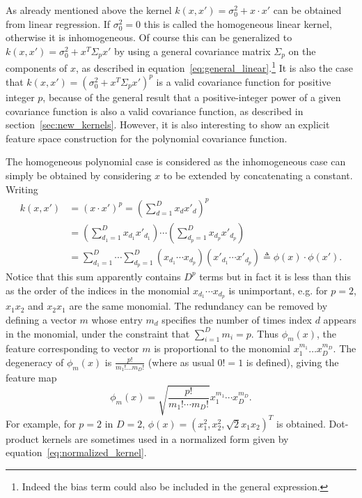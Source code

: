 \documentclass[11pt]{book}
\begin{document}
As already mentioned above the kernel $k(x, x') = \sigma_0^2 + x \cdot x'$ can be obtained from linear regression. If $\sigma_0^2 = 0$ this is called the homogeneous linear kernel, otherwise it is inhomogeneous. Of course this can be generalized to $k(x, x') = \sigma_0^2 + x^T \Sigma_p x'$ by using a general covariance matrix $\Sigma_p$ on the components of $x$, as described in equation~\eqref{eq:general_linear}.\footnote{Indeed the bias term could also be included in the general expression.} It is also the case that $k(x, x') = (\sigma_0^2 + x^T \Sigma_p x')^p$ is a valid covariance function for positive integer $p$, because of the general result that a positive-integer power of a given covariance function is also a valid covariance function, as described in section~\ref{sec:new_kernels}. However, it is also interesting to show an explicit feature space construction for the polynomial covariance function.

The homogeneous polynomial case is considered as the inhomogeneous case can simply be obtained by considering $x$ to be extended by concatenating a constant. Writing
\begin{align}
\label{eq:polynomial_expansion}
k(x, x') &= (x \cdot x')^p = \left(\sum_{d=1}^D x_d x'_d\right)^p \\
&= \left(\sum_{d_1=1}^D x_{d_1} x'_{d_1}\right) \cdots \left(\sum_{d_p=1}^D x_{d_p} x'_{d_p}\right) \nonumber \\
&= \sum_{d_1=1}^D \cdots \sum_{d_p=1}^D (x_{d_1} \cdots x_{d_p})(x'_{d_1} \cdots x'_{d_p}) \triangleq \phi(x) \cdot \phi(x'). \nonumber
\end{align}
Notice that this sum apparently contains $D^p$ terms but in fact it is less than this as the order of the indices in the monomial $x_{d_1} \cdots x_{d_p}$ is unimportant, e.g. for $p = 2$, $x_1 x_2$ and $x_2 x_1$ are the same monomial. The redundancy can be removed by defining a vector $m$ whose entry $m_d$ specifies the number of times index $d$ appears in the monomial, under the constraint that $\sum_{i=1}^D m_i = p$. Thus $\phi_m(x)$, the feature corresponding to vector $m$ is proportional to the monomial $x_1^{m_1} \ldots x_D^{m_D}$. The degeneracy of $\phi_m(x)$ is $\frac{p!}{m_1! \ldots m_D!}$ (where as usual $0! = 1$ is defined), giving the feature map
\begin{equation}
\label{eq:polynomial_feature_map}
\phi_m(x) = \sqrt{\frac{p!}{m_1! \cdots m_D!}} x_1^{m_1} \cdots x_D^{m_D}.
\end{equation}
For example, for $p = 2$ in $D = 2$, $\phi(x) = (x_1^2, x_2^2, \sqrt{2}x_1 x_2)^T$ is obtained. Dot-product kernels are sometimes used in a normalized form given by equation~\eqref{eq:normalized_kernel}.
\end{document}
